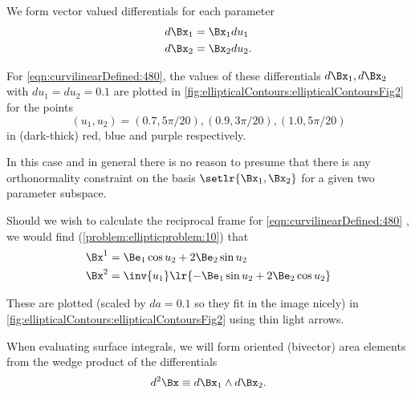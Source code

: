 We form vector valued differentials for each parameter
\begin{equation}\label{eqn:curvilinearDefined:500}
\begin{aligned}
d\Bx_{1} &= \Bx_1 du_1 \\
d\Bx_{2} &= \Bx_2 du_2.
\end{aligned}
\end{equation}

For \cref{eqn:curvilinearDefined:480},
the values of these differentials \( d\Bx_1, d\Bx_2 \) with \( du_1 = du_2 = 0.1 \) are plotted
in
\cref{fig:ellipticalContours:ellipticalContoursFig2}
for the points
\begin{equation}\label{eqn:curvilinearDefined:600}
(u_1, u_2) = (0.7, 5 \pi/20), (0.9, 3 \pi/20), (1.0, 5 \pi/20)
\end{equation}
in
(dark-thick) red, blue and purple respectively.


In this case and in general there is no reason to presume that there is any orthonormality constraint on the basis \( \setlr{ \Bx_{1}, \Bx_{2} } \) for a given two parameter subspace.

Should we wish to calculate the reciprocal frame
for \cref{eqn:curvilinearDefined:480}
, we would find
(\cref{problem:ellipticproblem:10}) that
\begin{equation}\label{eqn:curvilinearDefined:540}
\begin{aligned}
\Bx^{1} &= \Be_1 \cos u_2 + 2 \Be_2 \sin u_2 \\
\Bx^{2} &= \inv{u_1} \lr{ - \Be_1 \sin u_2 + 2 \Be_2 \cos u_2 }
\end{aligned}
\end{equation}

These are plotted (scaled by \( da = 0.1 \) so they fit in the image nicely) in \cref{fig:ellipticalContours:ellipticalContoursFig2} using thin light arrows.

When evaluating surface integrals, we will form
oriented (bivector) area elements from the wedge product of the differentials
\begin{equation}\label{eqn:curvilinearDefined:60}
d^2 \Bx \equiv d\Bx_{1} \wedge d\Bx_{2}.
\end{equation}

